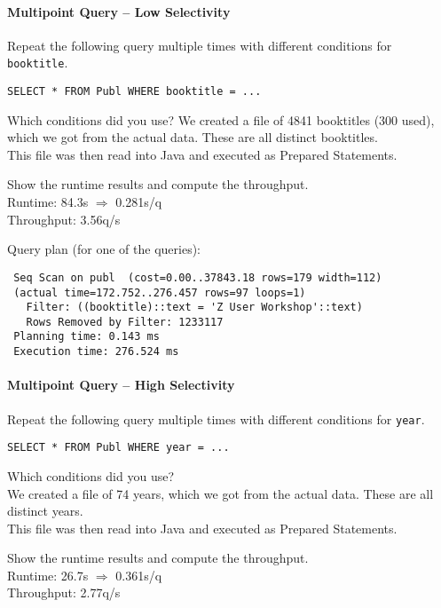 \documentclass[11pt]{scrartcl}
\begin{document}
\paragraph{Multipoint Query -- Low Selectivity}

Repeat the following query multiple times with different conditions for {\tt booktitle}.

{\small
\begin{verbatim}
SELECT * FROM Publ WHERE booktitle = ...
\end{verbatim}
}

\noindent
Which conditions did you use?
We created a file of 4841 booktitles (300 used), which we got from the actual data. These are all distinct booktitles.\\
This file was then read into Java and executed as Prepared Statements.

\smallskip\noindent
Show the runtime results and compute the throughput.\\
Runtime: 84.3s $\Rightarrow$ 0.281s/q\\
Throughput: 3.56q/s

\smallskip\noindent
Query plan (for one of the queries):
{\small
\begin{verbatim}
 Seq Scan on publ  (cost=0.00..37843.18 rows=179 width=112)
 (actual time=172.752..276.457 rows=97 loops=1)
   Filter: ((booktitle)::text = 'Z User Workshop'::text)
   Rows Removed by Filter: 1233117
 Planning time: 0.143 ms
 Execution time: 276.524 ms
\end{verbatim}
}


\paragraph{Multipoint Query -- High Selectivity}

Repeat the following query multiple times with different conditions for {\tt year}.

{\small
\begin{verbatim}
SELECT * FROM Publ WHERE year = ...
\end{verbatim}
}

\noindent
Which conditions did you use?\\
We created a file of 74 years, which we got from the actual data. These are all distinct years.\\
This file was then read into Java and executed as Prepared Statements.

\smallskip\noindent
Show the runtime results and compute the throughput.\\
Runtime: 26.7s $\Rightarrow$ 0.361s/q\\
Throughput: 2.77q/s
\end{document}
